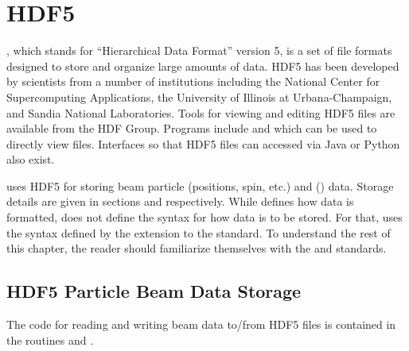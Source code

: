 \chapter{HDF5}
\label{c:hdf5}

, which stands for ``Hierarchical Data Format'' version 5\cite{b:hdf5}, is a set of file
formats designed to store and organize large amounts of data. HDF5 has been developed by scientists
from a number of institutions including the National Center for Supercomputing Applications, the
University of Illinois at Urbana-Champaign, and Sandia National Laboratories. Tools for viewing and
editing HDF5 files are available from the HDF Group\cite{b:hdf5}. Programs include  and
 which can be used to directly view files. Interfaces so that HDF5 files can accessed
via Java or Python also exist.

\bmad uses HDF5 for storing beam particle (positions, spin, etc.) and 
() data. Storage details are given in sections  and
 respectively. While  defines how data is formatted,  does not
define the syntax for how data is to be stored. For that, \bmad uses the syntax defined by the
 extension to the  standard\cite{b:openpmd}. To understand the rest of
this chapter, the reader should familiarize themselves with the  and 
standards.

\section{HDF5 Particle Beam Data Storage}
\label{s:hdf5.beam}

The code for reading and writing beam data to/from HDF5 files is contained in the routines
 and .

